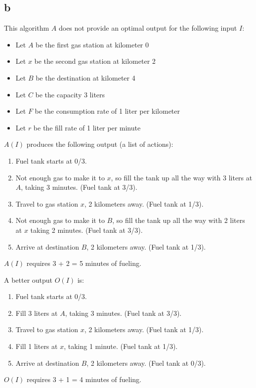 \documentclass[letterpaper,notitlepage,twoside]{article}
\begin{document}
\subsection*{b}
This algorithm $A$ does not provide an optimal output for the following input $I$:\\
\begin{itemize}
	\item Let $A$ be the first gas station at kilometer 0
	\item Let $x$ be the second gas station at kilometer 2
	\item Let $B$ be the destination at kilometer 4
	\item Let $C$ be the capacity 3 liters
	\item Let $F$ be the consumption rate of 1 liter per kilometer
	\item Let $r$ be the fill rate of 1 liter per minute
\end{itemize}
$A(I)$ produces the following output (a list of actions):
\begin{enumerate}
	\item Fuel tank starts at 0/3.
	\item Not enough gas to make it to $x$, so fill the tank up all the way with 3 liters at $A$, taking 3 minutes. (Fuel tank at 3/3).
	\item Travel to gas station $x$, 2 kilometers away. (Fuel tank at 1/3).
	\item Not enough gas to make it to $B$, so fill the tank up all the way with 2 liters at $x$ taking 2 minutes. (Fuel tank at 3/3).
	\item Arrive at destination $B$, 2 kilometers away. (Fuel tank at 1/3).
\end{enumerate}
$A(I)$ requires 3 + 2 = 5 minutes of fueling.

A better output $O(I)$ is:
\begin{enumerate}
	\item Fuel tank starts at 0/3.
	\item Fill 3 liters at $A$, taking 3 minutes. (Fuel tank at 3/3).
	\item Travel to gas station $x$, 2 kilometers away. (Fuel tank at 1/3).
	\item Fill 1 liters at $x$, taking 1 minute. (Fuel tank at 1/3).
	\item Arrive at destination $B$, 2 kilometers away. (Fuel tank at 0/3).
\end{enumerate}
$O(I)$ requires 3 + 1 = 4 minutes of fueling.\\
\end{document}
